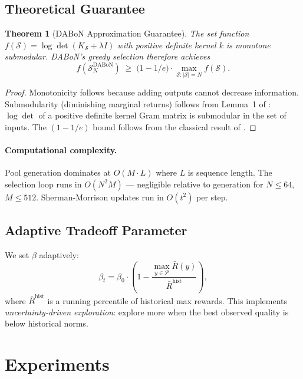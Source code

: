 \documentclass{article}
\newtheorem{theorem}{Theorem}
\newcommand{\cS}{\mathcal{S}}
\newcommand{\Rbar}{\bar{R}}
\begin{document}
\subsection{Theoretical Guarantee}
\label{sec:guarantee}

\begin{theorem}[DABoN Approximation Guarantee]
\label{thm:submodular}
The set function $f(\cS) = \log\det(K_\cS + \lambda I)$ with positive
definite kernel $k$ is monotone submodular.  DABoN's greedy selection
therefore achieves
\[
  f(\cS_N^{\mathrm{DABoN}}) \;\ge\; \bigl(1 - 1/e\bigr)\cdot
  \max_{\cS : |\cS| = N} f(\cS).
\]
\end{theorem}

\begin{proof}
Monotonicity follows because adding outputs cannot decrease information.
Submodularity (diminishing marginal returns) follows from Lemma~1 of
\citet{krause2012near}: $\log\det$ of a positive definite kernel Gram
matrix is submodular in the set of inputs.  The $(1-1/e)$ bound follows
from the classical result of \citet{nemhauser1978analysis}.
\end{proof}

\paragraph{Computational complexity.}
Pool generation dominates at $O(M \cdot L)$ where $L$ is sequence length.
The selection loop runs in $O(N^2 M)$ --- negligible relative to generation
for $N \le 64$, $M \le 512$.  Sherman-Morrison updates run in $O(t^2)$ per
step.

\subsection{Adaptive Tradeoff Parameter}
\label{sec:beta}

We set $\beta$ adaptively:
\[
  \beta_t = \beta_0 \cdot
  \left(1 - \frac{\max_{y\in\mathcal{P}}\Rbar(y)}{\Rbar^{\mathrm{hist}}}\right),
\]
where $\Rbar^{\mathrm{hist}}$ is a running percentile of historical max rewards.
This implements \emph{uncertainty-driven exploration}: explore more when the
best observed quality is below historical norms.

\section{Experiments}
\label{sec:experiments}
\end{document}
